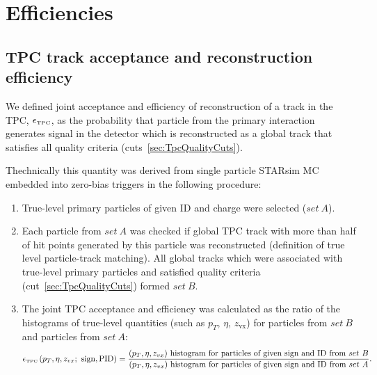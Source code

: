 

\chapter{Efficiencies}\label{chap:efficiencies}

\section{TPC track acceptance and reconstruction efficiency}\label{sec:tpcAccAndEff}
We defined joint acceptance and efficiency of reconstruction of a track in the TPC, $\epsilon_{\textrm{\tiny TPC}}$, as the probability that particle from the primary interaction generates signal in the detector which is reconstructed as a global track that satisfies all quality criteria (cuts~\ref{sec:TpcQualityCuts}).

Thechnically this quantity was derived from single particle STARsim MC embedded into zero-bias triggers in the following procedure:
\begin{enumerate}
	\item True-level primary particles of given ID and charge were selected ($set~A$).
	\item Each particle from $set~A$ was checked if global TPC track with more than half of hit points generated by this particle was reconstructed (definition of true level particle-track matching). All global tracks which were associated with true-level primary particles and satisfied quality criteria (cut~\ref{sec:TpcQualityCuts}) formed $set~B$.
	\item The joint TPC acceptance and efficiency was calculated as the ratio of the histograms of true-level quantities (such as $p_{T}$, $\eta$, $z_{\textrm{vx}}$) for particles from $set~B$ and particles from $set~A$:
	\begin{equation}\label{eq:tpcAccAndEffDefinition}
		\epsilon_{\textrm{\tiny TPC}}\left(p_{T}, \eta, z_{vx};~\textrm{sign},\textrm{PID}\right) = \frac{(p_{T},\eta, z_{vx})~\textrm{histogram for particles of given sign and ID from}~set~B}{(p_{T},\eta, z_{vx})~\textrm{histogram for particles of given sign and ID from}~set~A}.
	\end{equation}

\end{enumerate}

